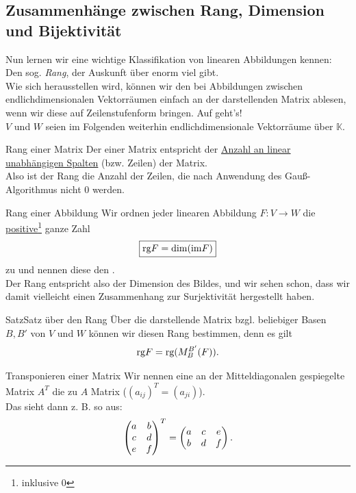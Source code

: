 \subsection{Zusammenhänge zwischen Rang, Dimension und Bijektivität}
Nun lernen wir eine wichtige Klassifikation von linearen Abbildungen kennen: Den sog. \textit{Rang}, der Auskunft über enorm viel gibt.\\
Wie sich herausstellen wird, können wir den bei Abbildungen zwischen endlichdimensionalen Vektorräumen einfach an der darstellenden Matrix ablesen, wenn wir diese auf Zeilenstufenform bringen. Auf geht's!\\
$V$ und $W$ seien im Folgenden weiterhin endlichdimensionale Vektorräume über $\mathbb{K}$.
\begin{Def}
{Rang einer Matrix}
Der  einer Matrix entspricht der \underline{Anzahl an linear unabhängigen Spalten} (bzw. Zeilen) der Matrix.\\
Also ist der Rang die Anzahl der Zeilen, die nach Anwendung des Gauß-Algorithmus nicht 0 werden.
\end{Def}
\begin{Def}
{Rang einer Abbildung}
Wir ordnen jeder linearen Abbildung $F:V\to W$ die \underline{positive}\footnote{inklusive 0} ganze Zahl
\begin{equation}
    \boxed{\text{rg} F=\dim(\text{im} F)}
\end{equation}
zu und nennen diese den .\\
Der Rang entspricht also der Dimension des Bildes, und wir sehen schon, dass wir damit vielleicht einen Zusammenhang zur Surjektivität hergestellt haben.
\end{Def}
\begin{Satz}
{Satz}{Satz über den Rang}
Über die darstellende Matrix bzgl. beliebiger Basen $B,B'$ von $V$ und $W$ können wir diesen Rang bestimmen, denn es gilt
\begin{equation*}
    \text{rg} F=\text{rg} (M_B^{B'}(F)).
\end{equation*}
\end{Satz}
\begin{Def}
{Transponieren einer Matrix}
Wir nennen eine an der Mitteldiagonalen gespiegelte Matrix $A^T$ die zu $A$  Matrix ($(a_{ij})^T=(a_{ji})$).\\
Das sieht dann z. B. so aus:
\begin{equation*}
    \begin{pmatrix}a&b\\c&d\\e&f\end{pmatrix}^T=\begin{pmatrix}a&c&e\\b&d&f\end{pmatrix}.
\end{equation*}
\end{Def}
